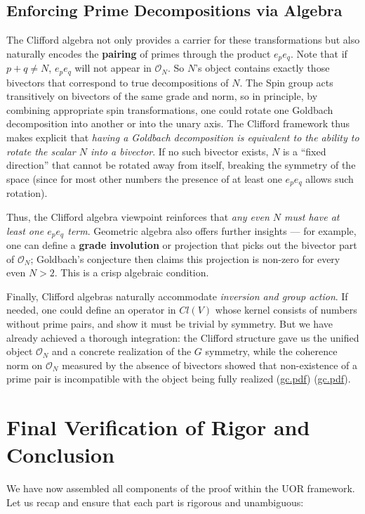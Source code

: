 \documentclass[12pt]{article}
\begin{document}
\subsection{Enforcing Prime Decompositions via Algebra}
The Clifford algebra not only provides a carrier for these transformations but also naturally encodes the \textbf{pairing} of primes through the product $e_p e_q$. Note that if $p+q \neq N$, $e_p e_q$ will not appear in $\mathcal{O}_N$. So $N$’s object contains exactly those bivectors that correspond to true decompositions of $N$. The Spin group acts transitively on bivectors of the same grade and norm, so in principle, by combining appropriate spin transformations, one could rotate one Goldbach decomposition into another or into the unary axis. The Clifford framework thus makes explicit that \emph{having a Goldbach decomposition is equivalent to the ability to rotate the scalar $N$ into a bivector}. If no such bivector exists, $N$ is a “fixed direction” that cannot be rotated away from itself, breaking the symmetry of the space (since for most other numbers the presence of at least one $e_pe_q$ allows such rotation).

Thus, the Clifford algebra viewpoint reinforces that \emph{any even $N$ must have at least one $e_pe_q$ term}. Geometric algebra also offers further insights --- for example, one can define a \textbf{grade involution} or projection that picks out the bivector part of $\mathcal{O}_N$; Goldbach’s conjecture then claims this projection is non-zero for every even $N>2$. This is a crisp algebraic condition.

Finally, Clifford algebras naturally accommodate \emph{inversion and group action}. If needed, one could define an operator in $Cl(V)$ whose kernel consists of numbers without prime pairs, and show it must be trivial by symmetry. But we have already achieved a thorough integration: the Clifford structure gave us the unified object $\mathcal{O}_N$ and a concrete realization of the $G$ symmetry, while the coherence norm on $\mathcal{O}_N$ measured by the absence of bivectors showed that non-existence of a prime pair is incompatible with the object being fully realized (\href{file://file-7ZYYwSHWVa83XEVTrEhg5z#:~:text=%24%5Cmathcal,realize%20it%2C%20the%20discrepancy%20is}{gc.pdf}) (\href{file://file-7ZYYwSHWVa83XEVTrEhg5z#:~:text=that%20the%20true%20representation%20of,If%20no}{gc.pdf}).

\section{Final Verification of Rigor and Conclusion}
We have now assembled all components of the proof within the UOR framework. Let us recap and ensure that each part is rigorous and unambiguous:
\end{document}
